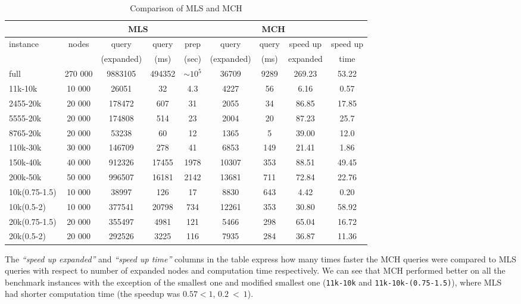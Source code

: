\begin{table}[h]
\tiny
\caption{Comparison of MLS and MCH}
\label{result}
\begin{tabular}{l|c|cc|ccccc}
 & & \multicolumn{2}{c}{MLS} & \multicolumn{5}{c}{MCH} \\ \cline{3-6} \hline
instance & nodes & query & query & prep & query & query & speed up & speed up \\ \hline
& & (expanded) & (ms) & (sec) & (expanded) & (ms) & expanded & time \\ \hline
full & 270 000 & 9883105 & 494352 & $\sim10^5$ & 36709 & 9289 & 269.23 & 53.22  \\ \hline
11k-10k & 10 000 & 26051 & 32 & 4.3 & 4227 & 56 & 6.16 & 0.57 \\ \hline
2455-20k & 20 000 & 178472 & 607 & 31 & 2055 & 34 & 86.85 & 17.85 \\ \hline
5555-20k & 20 000 & 174808 & 514 & 23 & 2004 & 20 & 87.23 & 25.7 \\ \hline
8765-20k & 20 000 & 53238 & 60 & 12 & 1365 & 5 & 39.00 & 12.0 \\ \hline
110k-30k & 30 000 & 146709 & 278 & 41 & 6853 & 149 & 21.41 & 1.86 \\ \hline
150k-40k & 40 000 & 912326 & 17455 & 1978 & 10307 & 353 & 88.51& 49.45 \\ \hline
200k-50k & 50 000 & 996507 & 16181 & 2142 & 13681 & 711 & 72.84& 22.76 \\ \hline
10k(0.75-1.5) & 10 000  & 38997 & 126 & 17 & 8830 & 643 & 4.42 & 0.20 \\ \hline
10k(0.5-2) & 10 000     & 377541 & 20798 & 734 & 12261 & 353 & 30.80 & 58.92 \\ \hline
20k(0.75-1.5) & 20 000 & 355497 & 4981 & 121 & 5466 & 298 & 65.04 & 16.72 \\ \hline
20k(0.5-2) & 20 000    & 292526 & 3225 & 116 & 7935 & 284 & 36.87 & 11.36 \\ \hline
\end{tabular}
\end{table}

The {\em ``speed up expanded''} and {\em ``speed up time''} columns in the table express how many times faster the MCH queries were compared to MLS queries with respect to number of expanded nodes and computation time respectively. We can see that MCH performed better on all the benchmark instances with the exception of the smallest one and modified smallest one ({\tt 11k-10k} and {\tt 11k-10k-(0.75-1.5)}), where MLS had shorter computation time (the speedup was $0.57 < 1$, $0.2~<~1$).


